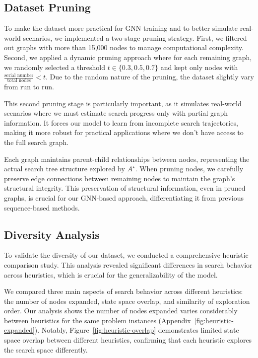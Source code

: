 \documentclass[letterpaper]{article}
\begin{document}
\subsection{Dataset Pruning}

To make the dataset more practical for GNN training and to better simulate real-world scenarios, we implemented a two-stage pruning strategy. First, we filtered out graphs with more than 15,000 nodes to manage computational complexity. Second, we applied a dynamic pruning approach where for each remaining graph, we randomly selected a threshold $t \in \{0.3, 0.5, 0.7\}$ and kept only nodes with $\frac{\text{serial number}}{\text{total nodes}} < t$. Due to the random nature of the pruning, the dataset slightly vary from run to run.

This second pruning stage is particularly important, as it simulates real-world scenarios where we must estimate search progress only with partial graph information. It forces our model to learn from incomplete search trajectories, making it more robust for practical applications where we don't have access to the full search graph.

Each graph maintains parent-child relationships between nodes, representing the actual search tree structure explored by $A^{\star}$. When pruning nodes, we carefully preserve edge connections between remaining nodes to maintain the graph's structural integrity. This preservation of structural information, even in pruned graphs, is crucial for our GNN-based approach, differentiating it from previous sequence-based methods.

\subsection{Diversity Analysis}

To validate the diversity of our dataset, we conducted a comprehensive heuristic comparison study. This analysis revealed significant differences in search behavior across heuristics, which is crucial for the generalizability of the model.

We compared three main aspects of search behavior across different heuristics: the number of nodes expanded, state space overlap, and similarity of exploration order.
Our analysis shows the number of nodes expanded varies considerably between heuristics for the same problem instances (Appendix~\ref{fig:heuristic-expanded}). Notably, Figure~\ref{fig:heuristic-overlap} demonstrates limited state space overlap between different heuristics, confirming that each heuristic explores the search space differently.
\end{document}
